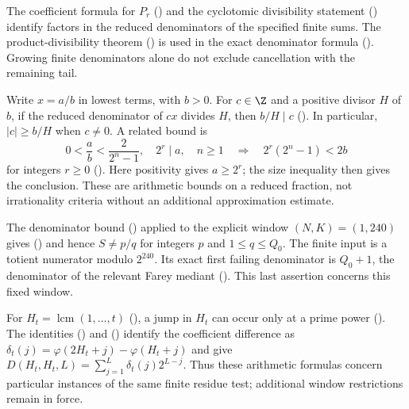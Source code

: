 \begin{description}[leftmargin=*,style=nextline]
\item[Cyclotomic factors of finite denominators.]
The coefficient formula for $P_r$
()
and the cyclotomic divisibility statement
()
identify factors in the reduced denominators of the specified finite sums.
The product-divisibility theorem
()
is used in the exact denominator formula
().
Growing finite denominators alone do not exclude cancellation with the
remaining tail.

\item[Numerator divisibility and denominator bounds.]
Write $x=a/b$ in lowest terms, with $b>0$. For $c\in\Z$ and a
positive divisor $H$ of $b$, if the reduced denominator of $cx$ divides
$H$, then $b/H\mid c$
().
In particular, $|c|\ge b/H$ when $c\ne0$. A related bound is
\[
 0<\frac ab<\frac2{2^n-1},\quad 2^r\mid a,\quad n\ge1
 \quad\Longrightarrow\quad 2^r(2^n-1)<2b
\]
for integers $r\ge0$
().
Here positivity gives $a\ge2^r$; the size inequality then gives the
conclusion. These are arithmetic bounds on a reduced fraction, not
irrationality criteria without an additional approximation estimate.

\item[Farey intervals.]
The denominator bound
()
applied to the explicit window $(N,K)=(1,240)$ gives
()
and hence $S\ne p/q$ for integers $p$ and $1\le q\le Q_0$.
The finite input is a totient numerator modulo $2^{240}$.
Its exact first failing denominator is $Q_0+1$, the denominator of the
relevant Farey mediant
().
This last assertion concerns this fixed window.

\item[Differences at least-common-multiple shifts.]
For $H_t=\operatorname{lcm}(1,\ldots,t)$
(),
a jump in $H_t$ can occur only at a prime power
().
The identities
()
and
()
identify the coefficient difference as
$\delta_t(j)=\varphi(2H_t+j)-\varphi(H_t+j)$ and give
$D(H_t,H_t,L)=\sum_{j=1}^L\delta_t(j)2^{L-j}$.
Thus these arithmetic formulas concern particular instances of the same
finite residue test; additional window restrictions remain in force.


\end{description}
